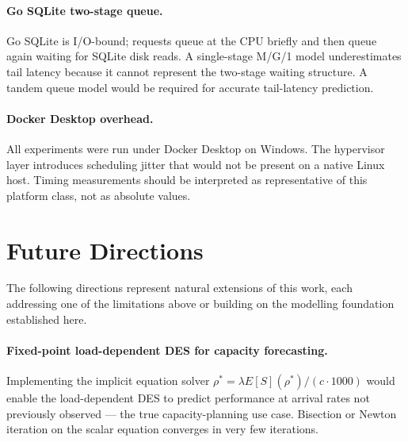 \paragraph{Go SQLite two-stage queue.}
Go SQLite is I/O-bound; requests queue at the CPU briefly and then queue again waiting for SQLite disk reads. A single-stage M/G/1 model underestimates tail latency because it cannot represent the two-stage waiting structure. A tandem queue model would be required for accurate tail-latency prediction.

\paragraph{Docker Desktop overhead.}
All experiments were run under Docker Desktop on Windows. The hypervisor layer introduces scheduling jitter that would not be present on a native Linux host. Timing measurements should be interpreted as representative of this platform class, not as absolute values.

\section{Future Directions}

The following directions represent natural extensions of this work, each addressing one of the limitations above or building on the modelling foundation established here.

\paragraph{Fixed-point load-dependent DES for capacity forecasting.}
Implementing the implicit equation solver $\rho^* = \lambda E[S](\rho^*) / (c \cdot 1000)$ would enable the load-dependent DES to predict performance at arrival rates not previously observed — the true capacity-planning use case. Bisection or Newton iteration on the scalar equation converges in very few iterations.

